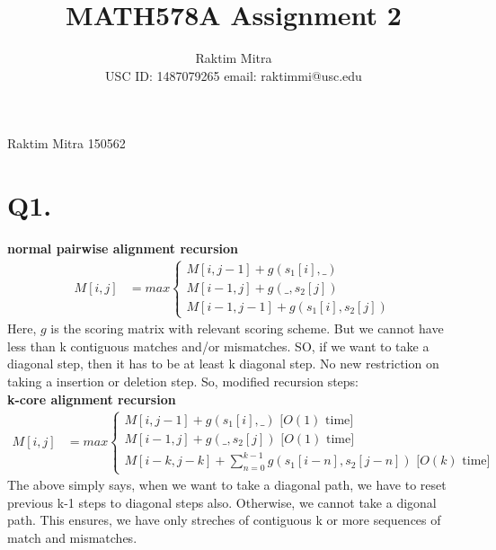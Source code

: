 \documentclass[a4paper,11pt]{article}
\begin{document}
\title{MATH578A Assignment 2 }
\author{Raktim Mitra \\ \small{USC ID: 1487079265\hspace{10pt} email: raktimmi@usc.edu}}
\maketitle
{}                              					%
								{Raktim Mitra}      						           		%
								{150562}																		%
								
\section*{Q1. }
\textbf{normal pairwise alignment recursion}\\
\begin{align*}
 M[i,j] &= max\begin{cases}
               M[i,j-1] + g(s_1[i],\_)\\
               M[i-1,j] + g(\_,s_2[j])\\
               M[i-1,j-1] + g(s_1[i],s_2[j])
              \end{cases}
\end{align*}
Here, $g$ is the scoring matrix with relevant scoring scheme. But we cannot have less than k contiguous matches and/or mismatches. SO, if  we want to take a diagonal step, then it has to be at least k diagonal step. No new restriction on taking a insertion or deletion step. So, modified recursion steps:\\
\textbf{k-core alignment recursion}\\
\begin{align*}
 M[i,j] &= max\begin{cases}
               M[i,j-1] + g(s_1[i],\_)\text{ [$O(1)$ time]}\\
               M[i-1,j] + g(\_,s_2[j])\text{ [$O(1)$ time]}\\
               M[i-k,j-k] + \sum_{n=0}^{k-1}g(s_1[i-n],s_2[j-n]) \text{ [$O(k)$ time]}
              \end{cases}
\end{align*}
The above simply says, when we want to take a diagonal path, we have to reset previous k-1 steps to diagonal steps also. Otherwise, we cannot take a digonal path. This ensures, we have only streches of contiguous k or more sequences of match and mismatches.
\end{document}
